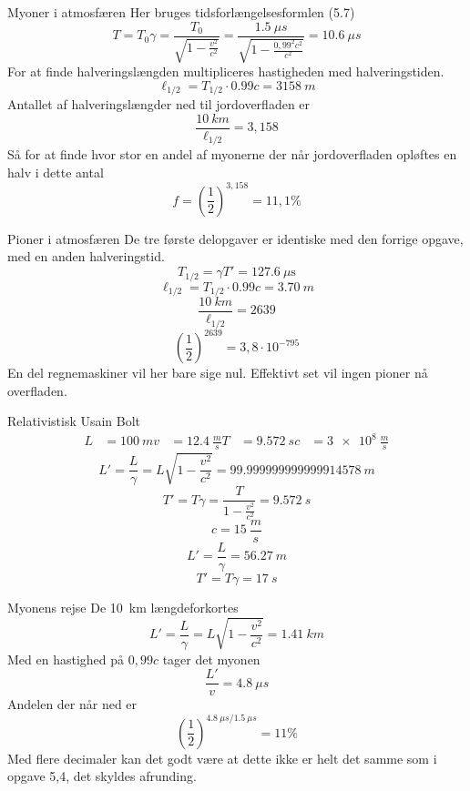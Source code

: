 \begin{opgave}{Myoner i atmosfæren}
    \opg Her bruges tidsforlængelsesformlen (5.7)
    $$
        T=T_0\gamma=\frac{T_0}{\sqrt{1-\frac{v^2}{c^2}}}=\frac{\SI{1,5}{\mu s}}{\sqrt{1-\frac{0,99^2c^2}{c^2}}}=\SI{10,6}{\mu s}
    $$
    \opg For at finde halveringslængden multipliceres hastigheden med halveringstiden.
    $$
    \ell_{1/2}=T_{1/2}\cdot 0.99 c=\SI{3158}{m}
    $$
    \opg Antallet af halveringslængder ned til jordoverfladen er
    $$
    \frac{\SI{10}{km}}{\ell_{1/2}}=3,158
    $$
    Så for at finde hvor stor en andel af myonerne der når jordoverfladen opløftes en halv i dette antal
    $$
    f=\left(\frac{1}{2}\right)^{3,158}=11,1\%
    $$
\end{opgave}

\begin{opgave}{Pioner i atmosfæren}
    De tre første delopgaver er identiske med den forrige opgave, med en anden halveringstid.
    \opg 
    $$
    T_{1/2}=\gamma T'=\SI{127,6}{\mu \second}
    $$
    \opg
    $$
    \ell_{1/2}=T_{1/2}\cdot 0.99 c=\SI{3,70}{m}
    $$
    \opg
    $$
    \frac{\SI{10}{km}}{\ell_{1/2}}=2639
    $$
    $$
    \left(\frac{1}{2}\right)^{2639}=3,8\cdot 10^{-795}
    $$
    En del regnemaskiner vil her bare sige nul.
    \opg
    Effektivt set vil ingen pioner nå overfladen.
\end{opgave}

\begin{opgave}{Relativistisk Usain Bolt}
\begin{align*}
    L&=\SI{100}{m}
    v&=\SI{12,4}{\frac{m}{s}}
    T&=\SI{9,572}{s}
    c&=\SI{3e8}{\frac{m}{s}}
\end{align*}
    \opg
    $$
    L'=\frac{L}{\gamma}=L\sqrt{1-\frac{v^2}{c^2}}=\SI{99.999999999999914578}{m}
    $$
    \opg
    $$
    T'=T\gamma=\frac{T}{1-\frac{v^2}{c^2}}=\SI{9.572}{s}
    $$
    \opg 
    $$
    c=\SI{15}{\frac{m}{s}}
    $$
    $$
    L'=\frac{L}{\gamma}=\SI{56,27}{m}
    $$
    $$
    T'=T\gamma=\SI{17}{s}
    $$
\end{opgave}

\begin{opgave}{Myonens rejse}
    \opg
    De \SI{10}{km} længdeforkortes
    $$
    L'=\frac{L}{\gamma}=L\sqrt{1-\frac{v^2}{c^2}}=\SI{1,41}{km}
    $$
    \opg
    Med en hastighed på $0,99 c$ tager det myonen
    $$
    \frac{L'}{v}=\SI{4,8}{\mu s}
    $$
    Andelen der når ned er
    $$
    \left(\frac{1}{2}\right)^{\SI{4,8}{\mu s}/\SI{1,5}{\mu s}}=11\%
    $$
    Med flere decimaler kan det godt være at dette ikke er helt det samme som i opgave 5,4, det skyldes afrunding.
\end{opgave}

